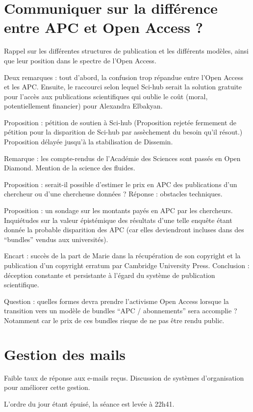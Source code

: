 \documentclass[a4paper]{article}
\begin{document}
\section{Communiquer sur la différence entre APC et Open Access ?}
Rappel sur les différentes structures de publication et les différents modèles, ainsi que leur position dans le spectre de l'Open Access.

Deux remarques : tout d'abord, la confusion trop répandue entre l'Open Access et les APC. Ensuite, le raccourci selon lequel Sci-hub serait la solution gratuite pour l'accès aux publications scientifiques qui oublie le coût (moral, potentiellement financier) pour Alexandra Elbakyan. 

Proposition : pétition de soutien à Sci-hub 
(Proposition rejetée fermement de pétition pour la disparition de Sci-hub par assèchement du besoin qu'il résout.)
Proposition délayée jusqu'à la stabilisation de Dissemin. 

Remarque : les compte-rendus de l'Académie des Sciences sont passés en Open Diamond. Mention de la science des fluides. 

Proposition : serait-il possible d'estimer le prix en APC des publications d'un chercheur ou d'une chercheuse données ? Réponse : obstacles techniques. 

Proposition : un sondage sur les montants payés en APC par les chercheurs.
Inquiétudes sur la valeur épistémique des résultats d'une telle enquête étant
donnée la probable disparition des APC (car elles deviendront incluses dans des
``bundles'' vendus aux universités). 

Encart : succès de la part de Marie dans la récupération de son copyright et la publication d'un copyright erratum par Cambridge University Press. 
Conclusion : déception constante et persistante à l'égard du système de publication scientifique. 

Question : quelles formes devra prendre l'activisme Open Access lorsque la
transition vers un modèle de bundles ``APC / abonnements'' sera accomplie ? 
Notamment car le prix de ces bundles risque de ne pas être rendu public.

\section{Gestion des mails}
Faible taux de réponse aux e-mails reçus. Discussion de systèmes d'organisation
pour améliorer cette gestion.


\bigskip

L'ordre du jour étant épuisé, la séance est levée à 22h41. 
\end{document}
